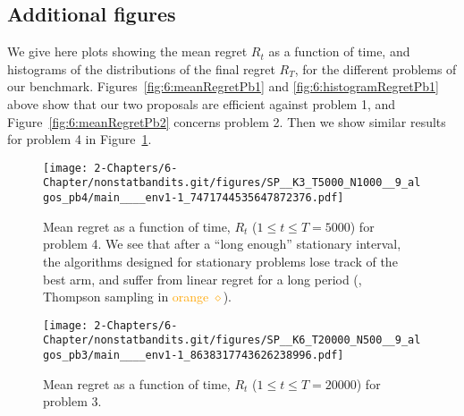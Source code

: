 \subsection{Additional figures}\label{app:6:moreFigures}

We give here plots showing the mean regret $R_t$ as a function of time, and histograms of the distributions of the final regret $R_T$, for the different problems of our benchmark.
%
Figures~\ref{fig:6:meanRegretPb1} and \ref{fig:6:histogramRegretPb1} above show that our two proposals are efficient against problem 1, and Figure~\ref{fig:6:meanRegretPb2} concerns problem 2.
Then we show similar results for problem 4 in Figure~\ref{fig:6:meanRegretPb4}.


\begin{figure}[h!]  %
    \centering
    \texttt{[image: 2-Chapters/6-Chapter/nonstatbandits.git/figures/SP\_\_K3\_T5000\_N1000\_\_9\_algos\_pb4/main\_\_\_\_env1-1\_7471744535647872376.pdf]}
    \caption[Mean regret as a function of time, $R_t$ ($1 \leq t \leq T = 5000$) for problem 4. We see that after a ``long enough'' stationary interval, the algorithms designed for stationary problems lose track of the best arm, and suffer from linear regret for a long period.]{Mean regret as a function of time, $R_t$ ($1 \leq t \leq T = 5000$) for problem 4. We see that after a ``long enough'' stationary interval, the algorithms designed for stationary problems lose track of the best arm, and suffer from linear regret for a long period (\eg, Thompson sampling in \textcolor{orange}{orange $\diamond$}).}
    \label{fig:6:meanRegretPb4}
\end{figure}

\begin{figure}[h!]  %
    \centering
    \texttt{[image: 2-Chapters/6-Chapter/nonstatbandits.git/figures/SP\_\_K6\_T20000\_N500\_\_9\_algos\_pb3/main\_\_\_\_env1-1\_8638317743626238996.pdf]}
    \caption{Mean regret as a function of time, $R_t$ ($1 \leq t \leq T = 20000$) for problem 3.}
    \label{fig:6:meanRegretPb3}
\end{figure}


